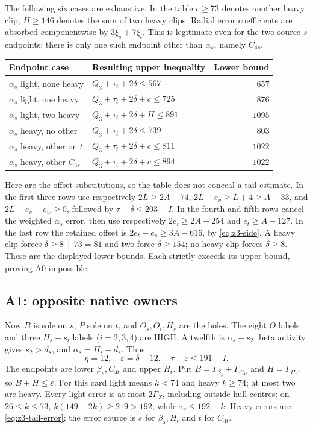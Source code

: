 \documentclass[11pt,letterpaper]{article}
\theoremstyle{definition}\newtheorem{definition}[theorem]{Definition}
\begin{document}
The following six cases are exhaustive. In the table $c\ge73$ denotes another heavy clip; $H\ge146$ denotes the sum of two heavy clips. Radial error coefficients are absorbed componentwise by $3\xi_s+7\xi_t$. This is legitimate even for the two source-$s$ endpoints: there is only one such endpoint other than $\alpha_s$, namely $C_{4s}$.
\begin{center}\small
\begin{tabular}{p{.31\linewidth}p{.42\linewidth}r}
Endpoint case&Resulting upper inequality&Lower bound\\\hline
$\alpha_s$ light, none heavy&$Q_3+\tau_t+2\delta\le567$&$657$\\
$\alpha_s$ light, one heavy&$Q_3+\tau_t+2\delta+c\le725$&$876$\\
$\alpha_s$ light, two heavy&$Q_3+\tau_t+2\delta+H\le891$&$1095$\\
$\alpha_s$ heavy, no other&$Q_3+\tau_t+2\delta\le739$&$803$\\
$\alpha_s$ heavy, other on $t$&$Q_3+\tau_t+2\delta+c\le811$&$1022$\\
$\alpha_s$ heavy, other $C_{4s}$&$Q_3+\tau_t+2\delta+c\le894$&$1022$
\end{tabular}
\end{center}
Here are the offset substitutions, so the table does not conceal a tail estimate. In the first three rows use respectively $2L\ge2A-74$, $2L-e_v\ge L+4\ge A-33$, and $2L-e_v-e_w\ge0$, followed by $\tau+\delta\le203-I$. In the fourth and fifth rows cancel the weighted $\alpha_s$ error, then use respectively $2e_t\ge2A-254$ and $e_t\ge A-127$. In the last row the retained offset is $2e_t-e_s\ge3A-616$, by \eqref{eq:z3-side}. A heavy clip forces $\delta\ge8+73=81$ and two force $\delta\ge154$; no heavy clip forces $\delta\ge8$. These are the displayed lower bounds. Each strictly exceeds its upper bound, proving A0 impossible.

\subsection{A1: opposite native owners}
Now $B$ is sole on $s$, $P$ sole on $t$, and $O_s,O_t,H_s$ are the holes. The eight $O$ labels and three $H_s+s_i$ labels ($i=2,3,4$) are HIGH. A twelfth is $\alpha_s+s_2$: beta activity gives $s_2>d_s$, and $\alpha_s=H_s-d_s$. Thus
\[
 \eta=12,\quad\varepsilon=\delta-12,\quad\tau+\varepsilon\le191-I.
\]
The endpoints are lower $\beta_s,C_{4t}$ and upper $H_t$. Put
$B=\Gamma_{\beta_s}+\Gamma_{C_{4t}}$ and $H=\Gamma_{H_t}$, so $B+H\le\varepsilon$.
For this card light means $k<74$ and heavy $k\ge74$; at most two are heavy. Every light error is at most $2\Gamma_Z$, including outside-hull centres: on $26\le k\le73$, $k(149-2k)\ge219>192$, while $\tau_v\le192-k$. Heavy errors are \eqref{eq:z3-tail-error}; the error source is $s$ for $\beta_s,H_t$ and $t$ for $C_{4t}$.
\end{document}
